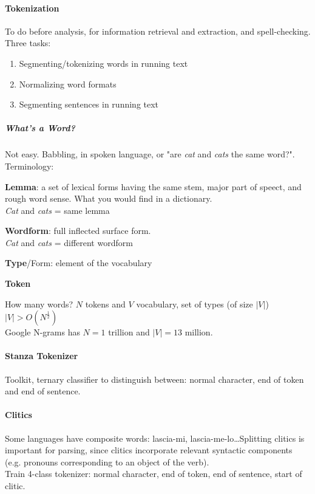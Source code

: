 \documentclass[10pt]{report}
\begin{document}
\paragraph{Tokenization} To do before analysis, for information retrieval and extraction, and spell-checking. Three tasks:\begin{enumerate}	
	\item Segmenting/tokenizing words in running text
	\item Normalizing word formats
	\item Segmenting sentences in running text
\end{enumerate}
\subparagraph{What's a Word?} Not easy. Babbling, in spoken language, or "are \textit{cat} and \textit{cats} the same word?".\\
Terminology:
\begin{list}{}{}
	\item \textbf{Lemma}: a set of lexical forms having the same stem, major part of speect, and rough word sense. What you would find in a dictionary.\\
	\textit{Cat} and \textit{cats} = same lemma
	\item \textbf{Wordform}: full inflected surface form.\\
	\textit{Cat} and \textit{cats} = different wordform
	\item \textbf{Type}/Form: element of the vocabulary
	\item \textbf{Token} %
\end{list}
How many words? $N$ tokens and $V$ vocabulary, set of types (of size $|V|$)\\$|V|>O(N^{\frac{1}{2}})$\\
Google N-grams has $N = 1$ trillion and $|V| = 13$ million.
\paragraph{Stanza Tokenizer} Toolkit, ternary classifier to distinguish between: normal character, end of token and end of sentence.
\paragraph{Clitics} Some languages have composite words: lascia-mi, lascia-me-lo\ldots Splitting clitics is important for parsing, since clitics incorporate relevant syntactic components (e.g. pronouns corresponding to an object of the verb).\\
Train 4-class tokenizer: normal character, end of token, end of sentence, start of clitic.
\end{document}
